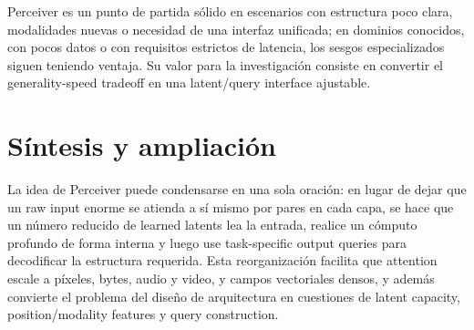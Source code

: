 \documentclass[a4paper]{article}
\begin{document}
Perceiver es un punto de partida sólido en escenarios con estructura poco clara, modalidades nuevas o necesidad de una interfaz unificada; en dominios conocidos, con pocos datos o con requisitos estrictos de latencia, los sesgos especializados siguen teniendo ventaja. Su valor para la investigación consiste en convertir el generality-speed tradeoff en una latent/query interface ajustable.
\section{Síntesis y ampliación}

La idea de Perceiver puede condensarse en una sola oración: en lugar de dejar que un raw input enorme se atienda a sí mismo por pares en cada capa, se hace que un número reducido de learned latents lea la entrada, realice un cómputo profundo de forma interna y luego use task-specific output queries para decodificar la estructura requerida. Esta reorganización facilita que attention escale a píxeles, bytes, audio y video, y campos vectoriales densos, y además convierte el problema del diseño de arquitectura en cuestiones de latent capacity, position/modality features y query construction.
\end{document}
